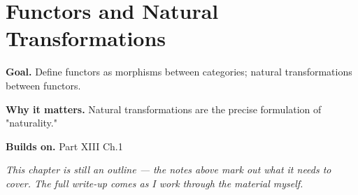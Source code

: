 \chapter{Functors and Natural Transformations}
\label{ch:13-category-theory-and-universal-structures-02}

\begin{chapterintro}
\textbf{Goal.} Define functors as morphisms between categories; natural transformations between functors.

\textbf{Why it matters.} Natural transformations are the precise formulation of "naturality."

\textbf{Builds on.} Part XIII Ch.1
\end{chapterintro}

\textit{This chapter is still an outline --- the notes above mark out what it needs to cover. The full write-up comes as I work through the material myself.}
